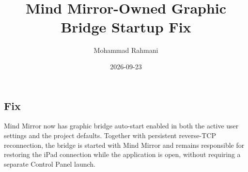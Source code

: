 \documentclass[a4paper]{article}
\title{Mind Mirror-Owned Graphic Bridge Startup Fix}
\date{2026-09-23}
\author{Mohammad Rahmani}
\begin{document}
   \maketitle

   \begin{preview}
      \section{Fix}
      Mind Mirror now has graphic bridge auto-start enabled in both the active user settings and the project defaults. Together with persistent reverse-TCP reconnection, the bridge is started with Mind Mirror and remains responsible for restoring the iPad connection while the application is open, without requiring a separate Control Panel launch.
   \end{preview}

   
   
\end{document}
